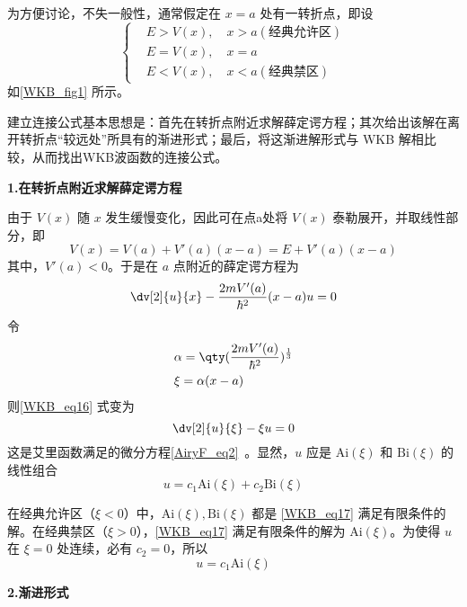 为方便讨论，不失一般性，通常假定在 $x=a$ 处有一转折点，即设
\begin{equation}
\left\{\begin{aligned}
&E>V(x),\quad x>a(\text{经典允许区})\\
&E=V(x),\quad x=a\\
&E<V(x),\quad x<a(\text{经典禁区})
\end{aligned}\right.
\end{equation}
如\autoref{WKB_fig1} 所示。

建立连接公式基本思想是：首先在转折点附近求解薛定谔方程；其次给出该解在离开转折点“较远处”所具有的渐进形式；最后，将这渐进解形式与 WKB 解相比较，从而找出WKB波函数的连接公式。

\textbf{1.在转折点附近求解薛定谔方程}

由于 $V(x)$ 随 $x$ 发生缓慢变化，因此可在点a处将 $V(x)$ 泰勒展开，并取线性部分，即
\begin{equation}
V(x)=V(a)+V'(a)(x-a)=E+V'(a)(x-a)
\end{equation}
 其中，$V'(a)<0$。于是在 $a$ 点附近的薛定谔方程为
 \begin{equation}\label{WKB_eq16}
 \dv[2]{u}{x}-\frac{2mV'(a)}{\hbar^2}(x-a)u=0
 \end{equation}
令
\begin{equation}
\begin{aligned}
&\alpha=\qty(\frac{2mV'(a)}{\hbar^2})^{\frac{1}{3}}\\
&\xi=\alpha(x-a)
\end{aligned}
\end{equation}
则\autoref{WKB_eq16} 式变为
\begin{equation}\label{WKB_eq17}
\dv[2]{u}{\xi}-\xi u=0
\end{equation}
这是艾里函数满足的微分方程\autoref{AiryF_eq2}~。显然，$u$ 应是 $\mathrm{Ai}(\xi)$ 和 $\mathrm{Bi}(\xi)$ 的线性组合
\begin{equation}
u=c_1 \mathrm{Ai}(\xi)+c_2 \mathrm{Bi}(\xi)
\end{equation}

在经典允许区（$\xi<0$）中，$\mathrm{Ai}(\xi),\mathrm{Bi}(\xi)$ 都是 \autoref{WKB_eq17} 满足有限条件的解。在经典禁区（$\xi>0$），\autoref{WKB_eq17} 满足有限条件的解为 $\mathrm{Ai}(\xi)$。为使得 $u$ 在 $\xi=0$ 处连续，必有 $c_2=0$，所以
\begin{equation}\label{WKB_eq18}
u=c_1\mathrm{Ai}(\xi)
\end{equation}

\textbf{2.渐进形式}

